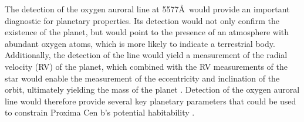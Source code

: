 \documentclass{emulateapj}
\newcommand{\XXX}[1]{#1}      %
\begin{document}
The detection of the oxygen auroral line at 5577\AA\ would provide an important diagnostic for planetary properties. Its detection would not only confirm the existence of the planet, but would point to the presence of an atmosphere with abundant oxygen atoms, which is more likely to indicate a terrestrial body. Additionally, the detection of the line would yield a measurement of the radial velocity (RV) of the planet, which combined with the RV measurements of the star \citep{Anglada-Escude2016} would enable the measurement of the eccentricity and inclination of the orbit, ultimately yielding the mass of the planet \XXX{\citep[see, e.g.,][]{LovisFischer2010}}. Detection of the oxygen auroral line would therefore provide several key planetary parameters that could be used to constrain Proxima Cen b's potential habitability \citep{Barnes2016,Meadows2016}.
\end{document}
